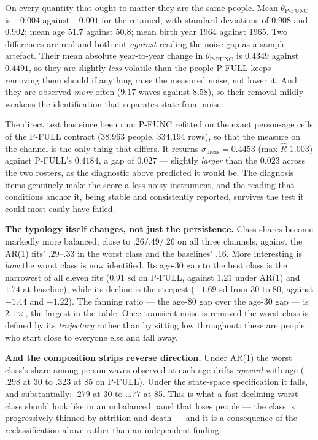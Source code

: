\documentclass[11pt]{article}
\begin{document}
On every quantity that ought to matter they are the same people. Mean
$\theta_{\text{P-FUNC}}$ is $+0.004$ against $-0.001$ for the retained, with
standard deviations of $0.908$ and $0.902$; mean age $51.7$ against $50.8$;
mean birth year 1964 against 1965. Two differences are real and both cut
\emph{against} reading the noise gap as a sample artefact. Their mean absolute
year-to-year change in $\theta_{\text{P-FUNC}}$ is $0.4349$ against $0.4491$,
so they are slightly \emph{less} volatile than the people P-FULL keeps ---
removing them should if anything raise the measured noise, not lower it. And
they are observed \emph{more} often ($9.17$ waves against $8.58$), so their
removal mildly weakens the identification that separates state from noise.

The direct test has since been run: P-FUNC refitted on the exact person-age
cells of the P-FULL contract (38,963 people, 334,194 rows), so that the
measure on the channel is the only thing that differs. It returns
$\sigma_{\text{meas}} = 0.4453$ (max $\hat R$ 1.003) against P-FULL's
$0.4184$, a gap of $0.027$ --- slightly \emph{larger} than the $0.023$ across
the two rosters, as the diagnostic above predicted it would be. The diagnosis
items genuinely make the score a less noisy instrument, and the reading that
conditions anchor it, being stable and consistently reported, survives the
test it could most easily have failed.

\textbf{The typology itself changes, not just the persistence.} Class shares
become markedly more balanced, close to $.26 / .49 / .26$ on all three
channels, against the AR(1) fits' $.29$--$.33$ in the worst class and the
baselines' $.16$. More interesting is \emph{how} the worst class is now
identified. Its age-30 gap to the best class is the narrowest of all eleven
fits ($0.91$ sd on P-FULL, against $1.21$ under AR(1) and $1.74$ at
baseline), while its decline is the steepest ($-1.69$ sd from 30 to 80,
against $-1.44$ and $-1.22$). The fanning ratio --- the age-80 gap over the
age-30 gap --- is $2.1\times$, the largest in the table. Once transient noise
is removed the worst class is defined by its \emph{trajectory} rather than by
sitting low throughout: these are people who start close to everyone else and
fall away.

\textbf{And the composition strips reverse direction.} Under AR(1) the
worst class's share among person-waves observed at each age drifts
\emph{upward} with age ($.298$ at 30 to $.323$ at 85 on P-FULL). Under the
state-space specification it falls, and substantially: $.279$ at 30 to
$.177$ at 85. This is what a fast-declining worst class should look like in
an unbalanced panel that loses people --- the class is progressively thinned
by attrition and death --- and it is a consequence of the reclassification
above rather than an independent finding.
\end{document}
